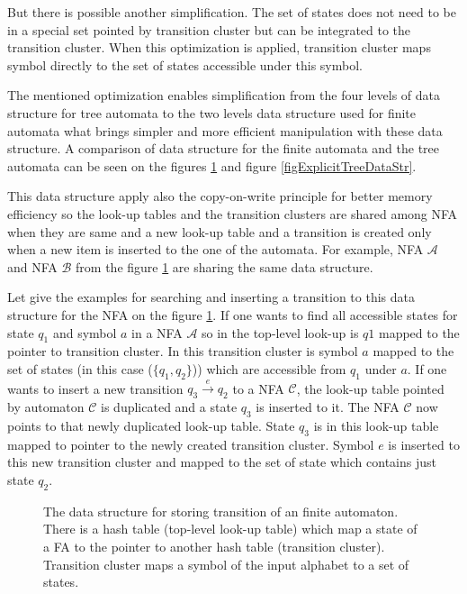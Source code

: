 But there is possible another simplification. The set of states does not need to be in a special set pointed by transition cluster but can be integrated
to the transition cluster. When this optimization is applied, transition cluster maps symbol directly to the set of states accessible under this symbol.

The mentioned optimization enables simplification from the four levels of data structure for tree automata to the two levels data structure used for finite
automata what brings simpler and more efficient manipulation with these data structure. A comparison of data structure for the finite automata and 
the tree automata can be seen on the figures \ref{figExplicitFADataStr} and figure \ref{figExplicitTreeDataStr}.

This data structure apply also the copy-on-write principle for better memory efficiency so the look-up tables and 
the transition clusters are shared among NFA when they are same and
a new look-up table and a transition is created only when a new item is inserted to the one of the automata. For example, NFA $\mathcal{A}$ and NFA $\mathcal{B}$
from the figure \ref{figExplicitFADataStr} are sharing the same data structure.

Let give the examples for searching and inserting a transition to this data structure for the NFA on the figure \ref{figExplicitFADataStr}. 
If one wants to find all accessible states for state $q_1$ and symbol $a$ in a NFA $\mathcal{A}$
so in the top-level look-up is $q1$ mapped to the pointer to transition cluster. In this
transition cluster is symbol $a$ mapped to the set of states (in this case ($\{q_1,q_2\}$)) which are accessible from $q_1$ under $a$.
If one wants to insert a new transition $q_3 \xrightarrow{e} q_2$ to a NFA $\mathcal{C}$, the look-up table pointed by automaton $\mathcal{C}$ is duplicated 
and a state $q_3$ is inserted to it. The NFA $\mathcal{C}$ now points to that newly duplicated look-up table. State $q_3$ is in this look-up table 
mapped to pointer to the newly created transition cluster. 
Symbol $e$ is inserted to this new transition cluster and mapped to the set of state which contains just state $q_2$.

\begin{figure}[bt]
\begin{center}

    \caption{The data structure for storing transition of an finite automaton. There is a hash table (top-level look-up table) 
      which map a state of a FA to the pointer to another hash table (transition cluster). Transition cluster maps a symbol of the input alphabet
      to a set of states.}
		\label{figExplicitFADataStr}
\end{center}
\end{figure}

